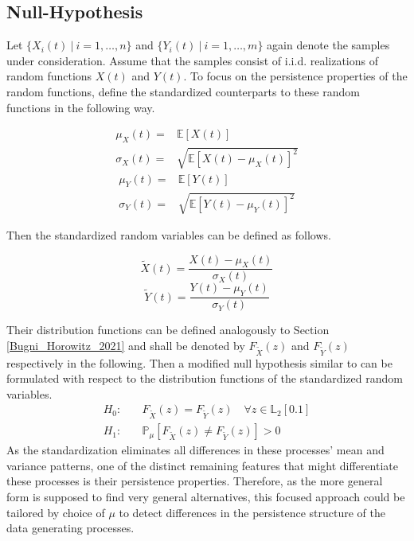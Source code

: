 \documentclass[12pt, a4paper]{article}
\theoremstyle{MAstyle} \newtheorem{assumption}{Assumption}[section]
\theoremstyle{MAstyle} \newtheorem{definition}{Definition}[section]
\theoremstyle{MAstyle} \newtheorem{theorem}{Theorem}[section]
\begin{document}
		\subsection{Null-Hypothesis}
		Let $\{X_i(t) \ | \  i = 1, \dots, n\}$ and $\{Y_i(t) \ | \  i = 1, \dots, m\}$ again denote the samples under consideration. Assume that the samples consist of i.i.d. realizations of random functions $X(t)$ and $Y(t)$.
		To focus on the persistence properties of the random functions, define the standardized counterparts to these random functions in the following way.
		\begin{multicols}{2}
			\noindent
			\begin{equation*}
				\begin{split}
					\mu_{X}(t) = &\mathbb{E}\left[X(t)\right] \\
					\sigma_{X}(t) = &\sqrt{\mathbb{E}\left[X(t) - \mu_{X}(t)\right]^2}
				\end{split}
			\end{equation*}
			\begin{equation}
				\begin{split}
					\mu_{Y}(t) = &\mathbb{E}\left[Y(t)\right] \\
					\sigma_{Y}(t) = &\sqrt{\mathbb{E}\left[Y(t) - \mu_{Y}(t)\right]^2}
				\end{split}
			\end{equation}
		\end{multicols}
		Then the standardized random variables can be defined as follows.
		\begin{multicols}{2}
			\noindent
			\begin{equation*}
				\tilde{X}(t) = \frac{X(t) - \mu_{X}(t)}{\sigma_{X}(t)}
			\end{equation*}
			\begin{equation}
				\tilde{Y}(t) = \frac{Y(t) - \mu_{Y}(t)}{\sigma_{Y}(t)}
			\end{equation}
		\end{multicols}
		Their distribution functions can be defined analogously to Section \ref{Bugni_Horowitz_2021} and shall be denoted by $F_{\tilde{X}}(z)$ and $F_{\tilde{Y}}(z)$ respectively in the following. Then a modified null hypothesis similar to \cite{bugni_permutation_2021} can be formulated with respect to the distribution functions of the standardized random variables.
		\begin{equation}
			\begin{split}
				H_0: \quad &F_{\tilde{X}}(z) = F_{\tilde{Y}}(z) \quad \forall z \in \mathbb{L}_2[0.1] \\
				H_1: \quad &\mathbb{P}_{\mu}\left[F_{\tilde{X}}(z) \neq F_{\tilde{Y}}(z)\right] > 0
			\end{split}
		\end{equation}
		As the standardization eliminates all differences in these processes' mean and variance patterns, one of the distinct remaining features that might differentiate these processes is their persistence properties. Therefore, as the more general form is supposed to find very general alternatives, this focused approach could be tailored by choice of $\mu$ to detect differences in the persistence structure of the data generating processes. \\
		
\end{document}
